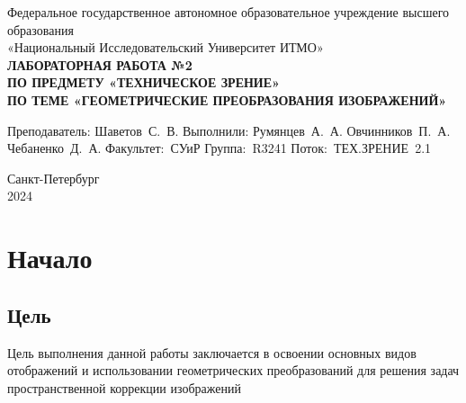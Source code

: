 \documentclass[a4paper, 16pt]{article}
\begin{document}
\begin{titlepage}

\begin{center}
\vfill

Федеральное государственное автономное образовательное учреждение высшего образования\\
«Национальный Исследовательский Университет ИТМО»\ \\

\vfill
{\large\bf ЛАБОРАТОРНАЯ РАБОТА №2\\
    ПО ПРЕДМЕТУ «ТЕХНИЧЕСКОЕ ЗРЕНИЕ»\\
    ПО ТЕМЕ «ГЕОМЕТРИЧЕСКИЕ ПРЕОБРАЗОВАНИЯ ИЗОБРАЖЕНИЙ»}\ \\
        
\vfill
    
\begin{flushright}
    \begin{minipage}{.45\textwidth}
        {
        \hbox{Преподаватель:}
        \hbox{Шаветов С. В.}
        \hbox{}
        \hbox{Выполнили:}
        \hbox{Румянцев А. А.}
        \hbox{Овчинников П. А.}
        \hbox{Чебаненко Д. А.}
        \hbox{}
        \hbox{Факультет: СУиР}
        \hbox{Группа: R3241}
        \hbox{Поток: ТЕХ.ЗРЕНИЕ 2.1}
        }
    \end{minipage}
\end{flushright}
        
\vfill
        
Санкт-Петербург\\
2024
\end{center}
\end{titlepage}
\setlength{\parskip}{1.5mm}


\tableofcontents


\newpage
\section{Начало}
\subsection{Цель}
\noindent Цель выполнения данной работы заключается в освоении основных видов отображений
и использовании геометрических преобразований для решения задач пространственной коррекции изображений
\end{document}

